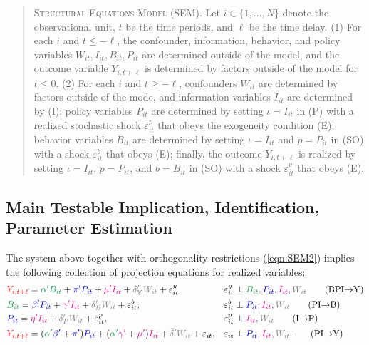 \documentclass[11pt,reqno,letter]{amsart}
\theoremstyle{definition}
\renewcommand{\to}{{\rightarrow}}
\def\bcolor{\color{ForestGreen}}
\def\pcolor{\color{blue}}
\def\icolor{\color{magenta}}
\def\wcolor{\color{gray}}
\def\ycolor{\color{red}}
\begin{document}
\begin{quote}
\textsc{Structural Equations Model (SEM)}.  Let $i \in \{1,..., N\}$ denote the observational unit,  $t$ be the time periods, and $\ell$ be the time delay.  (1) For each $i$ and $t \leq -\ell$, the confounder, information, behavior, and policy variables $W_{it}, I_{it},  B_{it}, P_{it}$ are determined outside of the model, and the outcome variable $Y_{i, t+\ell}$ is determined by factors outside of the model for $t \leq 0$.  (2) For each $i$ and $t \geq -\ell$, confounders $W_{it}$ are  determined by factors outside of the mode, and information variables $I_{it}$ are determined  by (I); policy variables $P_{it}$ are determined by setting $\iota = I_{it}$  in (P) with  a realized stochastic shock $\varepsilon^p_{it}$ that obeys the exogeneity condition (E);  behavior variables $B_{it}$ are determined by setting $\iota = I_{it}$ and $p= P_{it}$ in  (SO) with a shock $\varepsilon^b_{it}$ that obeys (E); finally, the outcome $Y_{i, t + \ell}$ is realized by setting $\iota = I_{it}$, $p= P_{it}$, and $b = B_{it}$ in  (SO) with a shock $\varepsilon^y_{it}$ that obeys (E). \end{quote}




\subsection{Main Testable Implication, Identification, Parameter Estimation}

The system above together with  orthogonality restrictions (\ref{eqn:SEM2}) implies the following collection of projection equations for realized variables:
\begin{align}
   &  {\ycolor  Y_{i,t+\ell}}
    = {\bcolor\alpha ' B_{it}} + {\pcolor\pi 'P_{it}} + {\icolor\mu'I_{it}} + {\wcolor\delta_Y 'W_{it}}  + \varepsilon^y_{it},
    &  & \varepsilon^y_{it} \perp {\bcolor B_{it}}, {\pcolor P_{it}}, {\icolor I_{it}}, {\wcolor W_{it}} \label{eq:R1} \tag{BPI$\to$Y} \\
    &  {\bcolor B_{it}}
     =  {\pcolor \beta' P_{it}} + {\icolor \gamma'I_{it}} +  {\wcolor \delta_B' W_{it}} + \varepsilon^b_{it},
   & & \varepsilon^b_{it} \perp {\pcolor P_{it}}, {\icolor I_{it}}, {\wcolor W_{it}}  \label{eq:R2} \tag{PI$\to$B}  \\
    & {\pcolor P_{it}}
    =  {\icolor\eta'I_{it}} + {\wcolor \delta_P' W_{it}} +   \varepsilon^p_{it},   & & \varepsilon^p_{it} \perp   {\icolor I_{it}}, {\wcolor W_{it}}  \label{eq:R3}  \tag{I$\to$P} \\
    &  {\ycolor  Y_{i,t+\ell}}
   =     ( {\bcolor\alpha '}  {\pcolor \beta' }+{\pcolor\pi'} )   {\pcolor P_{it}} +    ( {\bcolor\alpha '}  {\icolor \gamma'} + {\icolor \mu'}){\icolor I_{it} }+ {\wcolor \bar{\delta} '}{\wcolor W_{it}}  + {\bar \varepsilon}_{it},  &&  {\bar \varepsilon}_{it} \perp
  {\pcolor P_{it}},  {\icolor I_{it}}, {\wcolor W_{it}}.  \label{eq:R4} \tag{PI$\to$Y}
      \end{align}
\end{document}
